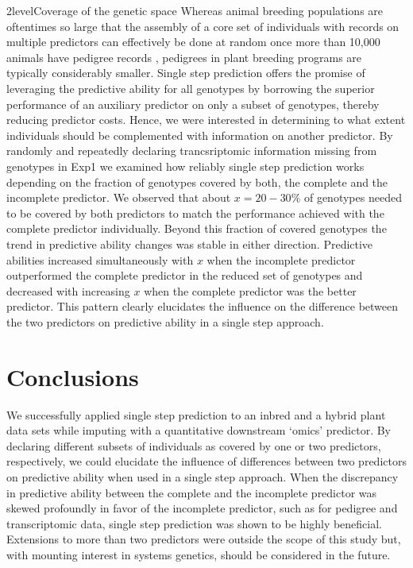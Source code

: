 \documentclass[12pt,titlepage]{article}
\begin{document}
\Genetics2level{Coverage of the genetic space}
Whereas animal breeding populations are oftentimes so large that the assembly 
of a core set of individuals with records on multiple predictors can effectively 
be done at random once more than 10,000 animals have pedigree records 
\cite{Fragomeni2015,Lourenco2015,Masuda2016}, pedigrees in plant breeding 
programs are typically considerably smaller.
Single step prediction offers the promise of leveraging the predictive ability
for all genotypes by borrowing the superior performance of an auxiliary
predictor on only a subset of genotypes, thereby reducing predictor costs.
Hence, we were interested in determining to what extent individuals should be 
complemented with information on another predictor.
By randomly and repeatedly declaring trancsriptomic information missing from
genotypes in Exp1 we examined how reliably single step prediction works
depending on the fraction of genotypes covered by both, the complete and the
incomplete predictor.
We observed that about $x=20-30\%$ of genotypes needed to be covered by both
predictors to match the performance achieved with the complete predictor
individually.
Beyond this fraction of covered genotypes the trend in predictive ability
changes was stable in either direction.
Predictive abilities increased simultaneously with $x$ when the incomplete
predictor outperformed the complete predictor in the reduced set of genotypes
and decreased with increasing $x$ when the complete predictor was the better
predictor.
This pattern clearly elucidates the influence on the difference between the
two predictors on predictive ability in a single step approach.



\section*{Conclusions}
We successfully applied single step prediction to an inbred and a hybrid plant
data sets while imputing with a quantitative downstream `omics' predictor.
By declaring different subsets of individuals as covered by one or two 
predictors, respectively, we could elucidate the influence of differences
between two predictors on predictive ability when used in a single step
approach.
When the discrepancy in predictive ability between the complete and the
incomplete predictor was skewed profoundly in favor of the incomplete predictor,
such as for pedigree and transcriptomic data, single step prediction was shown
to be highly beneficial.
Extensions to more than two predictors were outside the scope of this study
but, with mounting interest in systems genetics, should be considered in the
future.
\end{document}
